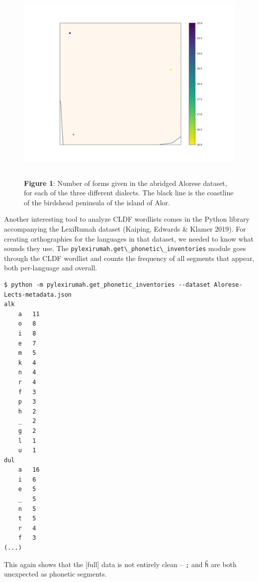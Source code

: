 \documentclass[
  a4paper,
  14pt,
  oneside,
  tablecaptionabove
]{scrbook}
\newcommand{\passthrough}[1]{#1}
\begin{document}
\begin{figure}
\centering
\includegraphics[width=5.20833in,height=3.90625in]{images/__f-origin.hypotheses.org_wp-content_blogs.dir_4500_files_2018_11_alorese-500x375.png}
\captionsetup{labelformat=empty}
\caption{\textbf{Figure 1}: Number of forms given in the abridged Alorese dataset, for each
of the three different dialects. The black line is the coastline of the
birdshead peninsula of the island of Alor.}
\end{figure}

Another interesting tool to analyze CLDF wordlists comes in the Python
library accompanying the LexiRumah dataset (Kaiping, Edwards \& Klamer
2019). For creating orthographies for the languages in that dataset, we
needed to know what sounds they use. The
\passthrough{\lstinline!pylexirumah.get\_phonetic\_inventories!} module
goes through the CLDF wordlist and counts the frequency of all segments
that appear, both per-language and overall.

\begin{lstlisting}
$ python -m pylexirumah.get_phonetic_inventories --dataset Alorese-Lects-metadata.json
alk
    a   11
    o   8
    i   8
    e   7
    m   5
    k   4
    n   4
    r   4
    f   3
    p   3
    h   2
    _   2
    g   2
    l   1
    u   1
dul
    a   16
    i   6
    e   5
    _   5
    n   5
    t   5
    r   4
    f   3
(...)
\end{lstlisting}

This again shows that the [full] data is not entirely clean --
\texttt{;} and \texttt{h̃} are both
unexpected as phonetic segments.
\end{document}
